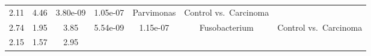 \documentclass[12pt,]{article}
\begin{document}
\begin{longtable}[]{@{}ccccccc@{}}
\begin{minipage}[t]{0.10\columnwidth}
2.11\strut
\end{minipage} & \begin{minipage}[t]{0.10\columnwidth}\centering\strut
4.46\strut
\end{minipage} & \begin{minipage}[t]{0.08\columnwidth}\centering\strut
3.80e-09\strut
\end{minipage} & \begin{minipage}[t]{0.08\columnwidth}\centering\strut
1.05e-07\strut
\end{minipage} & \begin{minipage}[t]{0.23\columnwidth}\centering\strut
Parvimonas\strut
\end{minipage} & \begin{minipage}[t]{0.16\columnwidth}\centering\strut
Control vs.~Carcinoma\strut
\end{minipage}\tabularnewline
\begin{minipage}[t]{0.06\columnwidth}\centering\strut
2.74\strut
\end{minipage} & \begin{minipage}[t]{0.10\columnwidth}\centering\strut
1.95\strut
\end{minipage} & \begin{minipage}[t]{0.10\columnwidth}\centering\strut
3.85\strut
\end{minipage} & \begin{minipage}[t]{0.08\columnwidth}\centering\strut
5.54e-09\strut
\end{minipage} & \begin{minipage}[t]{0.08\columnwidth}\centering\strut
1.15e-07\strut
\end{minipage} & \begin{minipage}[t]{0.23\columnwidth}\centering\strut
Fusobacterium\strut
\end{minipage} & \begin{minipage}[t]{0.16\columnwidth}\centering\strut
Control vs.~Carcinoma\strut
\end{minipage}\tabularnewline
\begin{minipage}[t]{0.06\columnwidth}\centering\strut
2.15\strut
\end{minipage} & \begin{minipage}[t]{0.10\columnwidth}\centering\strut
1.57\strut
\end{minipage} & \begin{minipage}[t]{0.10\columnwidth}\centering\strut
2.95\strut
\end{minipage} & \begin{minipage}[t]{0.08\columnwidth}\centering\strut

\end{minipage}
\end{longtable}
\end{document}
